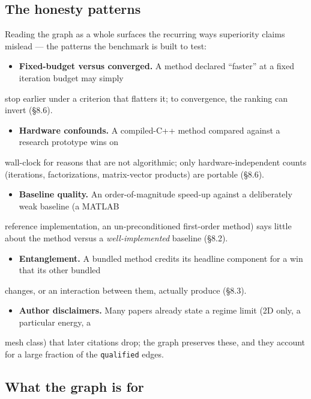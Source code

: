 \documentclass{egpubl}
\begin{document}
\subsection{The honesty patterns}

Reading the graph as a whole surfaces the recurring ways superiority claims mislead --- the patterns the
benchmark is built to test:

\begin{itemize}
  \item \textbf{Fixed-budget versus converged.} A method declared ``faster'' at a fixed iteration budget may simply
\end{itemize}
  stop earlier under a criterion that flatters it; to convergence, the ranking can invert (\S8.6).
\begin{itemize}
  \item \textbf{Hardware confounds.} A compiled-C++ method compared against a research prototype wins on
\end{itemize}
  wall-clock for reasons that are not algorithmic; only hardware-independent counts (iterations,
  factorizations, matrix-vector products) are portable (\S8.6).
\begin{itemize}
  \item \textbf{Baseline quality.} An order-of-magnitude speed-up against a deliberately weak baseline (a MATLAB
\end{itemize}
  reference implementation, an un-preconditioned first-order method) says little about the method
  versus a \emph{well-implemented} baseline (\S8.2).
\begin{itemize}
  \item \textbf{Entanglement.} A bundled method credits its headline component for a win that its other bundled
\end{itemize}
  changes, or an interaction between them, actually produce (\S8.3).
\begin{itemize}
  \item \textbf{Author disclaimers.} Many papers already state a regime limit (2D only, a particular energy, a
\end{itemize}
  mesh class) that later citations drop; the graph preserves these, and they account for a large
  fraction of the \texttt{qualified} edges.

\subsection{What the graph is for}
\end{document}
